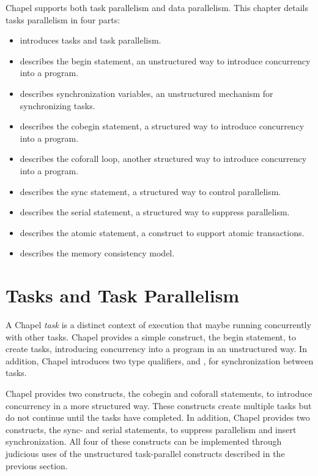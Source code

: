 \label{Task_Parallelism_and_Synchronization}

Chapel supports both task parallelism and data parallelism.  This
chapter details tasks parallelism in four parts:
\begin{itemize}
\item {} introduces tasks and task parallelism.
\item {} describes the begin statement, an unstructured way
to introduce concurrency into a program.
\item {} describes synchronization
variables, an unstructured mechanism for synchronizing tasks.
\item {} describes the cobegin statement, a structured way to
introduce concurrency into a program.
\item {} describes the coforall loop, another structured way to
introduce concurrency into a program.
\item {} describes the sync statement, a structured
way to control parallelism.
\item {} describes the serial statement, a structured way to suppress
parallelism.
\item {} describes the atomic statement, a construct to
support atomic transactions.
\item {}
describes the memory consistency model.
\end{itemize}

\section{Tasks and Task Parallelism}
\label{Task_parallelism}

A Chapel \emph{task} is a distinct context of execution that maybe
running concurrently with other tasks.  Chapel provides a simple
construct, the begin statement, to create tasks, introducing
concurrency into a program in an unstructured way.  In addition,
Chapel introduces two type qualifiers,  and ,
for synchronization between tasks.

Chapel provides two constructs, the cobegin and coforall statements,
to introduce concurrency in a more structured way.  These constructs
create multiple tasks but do not continue until the tasks have
completed.  In addition, Chapel provides two constructs, the sync- and
serial statements, to suppress parallelism and insert synchronization.
All four of these constructs can be implemented through judicious uses
of the unstructured task-parallel constructs described in the previous
section.



